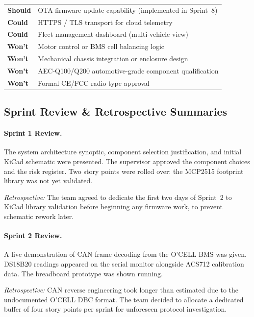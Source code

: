 \begin{table}[H]
\begin{tabular}{>{\bfseries}p{1.5cm} p{10.5cm}}
\textbf{Should}  & OTA firmware update capability (implemented in Sprint~8) \\
\textbf{Could}   & HTTPS / TLS transport for cloud telemetry \\
\textbf{Could}   & Fleet management dashboard (multi-vehicle view) \\
\midrule
\textbf{Won't}   & Motor control or BMS cell balancing logic \\
\textbf{Won't}   & Mechanical chassis integration or enclosure design \\
\textbf{Won't}   & AEC-Q100/Q200 automotive-grade component qualification \\
\textbf{Won't}   & Formal CE/FCC radio type approval \\
\bottomrule
\end{tabular}
\end{table}

\subsection{Sprint Review \& Retrospective Summaries}

\paragraph{Sprint 1 Review.} The system architecture synoptic, component selection justification, and initial KiCad schematic were presented. The supervisor approved the component choices and the risk register. Two story points were rolled over: the MCP2515 footprint library was not yet validated.

\textit{Retrospective:} The team agreed to dedicate the first two days of Sprint~2 to KiCad library validation before beginning any firmware work, to prevent schematic rework later.

\paragraph{Sprint 2 Review.} A live demonstration of CAN frame decoding from the O'CELL BMS was given. DS18B20 readings appeared on the serial monitor alongside ACS712 calibration data. The breadboard prototype was shown running.

\textit{Retrospective:} CAN reverse engineering took longer than estimated due to the undocumented O'CELL DBC format. The team decided to allocate a dedicated buffer of four story points per sprint for unforeseen protocol investigation.

